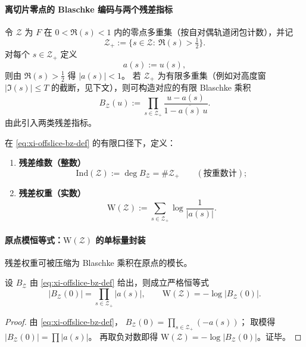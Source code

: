 \paragraph{离切片零点的 Blaschke 编码与两个残差指标}
令 \(\mathcal{Z}\) 为 \(F\) 在 \(0<\Re(s)<1\) 内的零点多重集（按自对偶轨道闭包计数），并记
\[
\mathcal Z_{+}:=\{s\in\mathcal Z:\ \Re(s)>\tfrac12\}.
\]
对每个 \(s\in\mathcal Z_{+}\) 定义
\begin{equation}\label{eq:xi-offslice-a-of-s}
a(s):=u(s),
\end{equation}
则由 \(\Re(s)>\tfrac12\) 得 \(|a(s)|<1\)。
若 \(\mathcal Z_{+}\) 为有限多重集（例如对高度窗 \(|\Im(s)|\le T\) 的截断，见下文），则可构造对应的有限 Blaschke 乘积
\begin{equation}\label{eq:xi-offslice-bz-def}
B_{\mathcal Z}(u):=\prod_{s\in\mathcal Z_{+}}\frac{u-a(s)}{1-\overline{a(s)}\,u}.
\end{equation}
由此引入两类残差指标。

\begin{definition}[残差维数与残差权重]\label{def:xi-offslice-ind-weight}
在 \eqref{eq:xi-offslice-bz-def} 的有限口径下，定义：
\begin{enumerate}
  \item \textbf{残差维数（整数）}
  \[
  \mathrm{Ind}(\mathcal Z):=\deg B_{\mathcal Z}= \#\mathcal Z_{+}\qquad(\text{按重数计});
  \]
  \item \textbf{残差权重（实数）}
  \[
  \mathrm{W}(\mathcal Z):=\sum_{s\in\mathcal Z_{+}}\log\frac{1}{|a(s)|}.
  \]
\end{enumerate}
\end{definition}

\paragraph{原点模恒等式：\texorpdfstring{$\mathrm{W}(\mathcal Z)$}{W(Z)} 的单标量封装}
残差权重可被压缩为 Blaschke 乘积在原点的模长。

\begin{theorem}\label{thm:xi-offslice-blaschke-origin-modulus}
设 \(B_{\mathcal Z}\) 由 \eqref{eq:xi-offslice-bz-def} 给出，则成立严格恒等式
\[
|B_{\mathcal Z}(0)|=\prod_{s\in\mathcal Z_{+}}|a(s)|,
\qquad
\mathrm{W}(\mathcal Z)=-\log|B_{\mathcal Z}(0)|.
\]
\end{theorem}

\begin{proof}
由 \eqref{eq:xi-offslice-bz-def}，
\(
B_{\mathcal Z}(0)=\prod_{s\in\mathcal Z_{+}}(-a(s))
\)；
取模得 \(|B_{\mathcal Z}(0)|=\prod|a(s)|\)。
再取负对数即得 \(\mathrm{W}(\mathcal Z)=-\log|B_{\mathcal Z}(0)|\)。证毕。
\end{proof}


